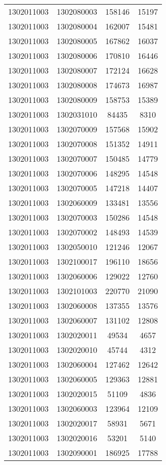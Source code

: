 \begin{longtable}[h]{llcc}
		1302011003 & 1302080003 & 158146 & 15197\\
		1302011003 & 1302080004 & 162007 & 15481\\
		1302011003 & 1302080005 & 167862 & 16037\\
		1302011003 & 1302080006 & 170810 & 16446\\
		1302011003 & 1302080007 & 172124 & 16628\\
		1302011003 & 1302080008 & 174673 & 16987\\
		1302011003 & 1302080009 & 158753 & 15389\\
		1302011003 & 1302031010 & 84435 & 8310\\
		1302011003 & 1302070009 & 157568 & 15902\\
		1302011003 & 1302070008 & 151352 & 14911\\
		1302011003 & 1302070007 & 150485 & 14779\\
		1302011003 & 1302070006 & 148295 & 14548\\
		1302011003 & 1302070005 & 147218 & 14407\\
		1302011003 & 1302060009 & 133481 & 13556\\
		1302011003 & 1302070003 & 150286 & 14548\\
		1302011003 & 1302070002 & 148493 & 14539\\
		1302011003 & 1302050010 & 121246 & 12067\\
		1302011003 & 1302100017 & 196110 & 18656\\
		1302011003 & 1302060006 & 129022 & 12760\\
		1302011003 & 1302101003 & 220770 & 21090\\
		1302011003 & 1302060008 & 137355 & 13576\\
		1302011003 & 1302060007 & 131102 & 12808\\
		1302011003 & 1302020011 & 49534 & 4657\\
		1302011003 & 1302020010 & 45744 & 4312\\
		1302011003 & 1302060004 & 127462 & 12642\\
		1302011003 & 1302060005 & 129363 & 12881\\
		1302011003 & 1302020015 & 51109 & 4836\\
		1302011003 & 1302060003 & 123964 & 12109\\
		1302011003 & 1302020017 & 58931 & 5671\\
		1302011003 & 1302020016 & 53201 & 5140\\
		1302011003 & 1302090001 & 186925 & 17788\\

\end{longtable}
